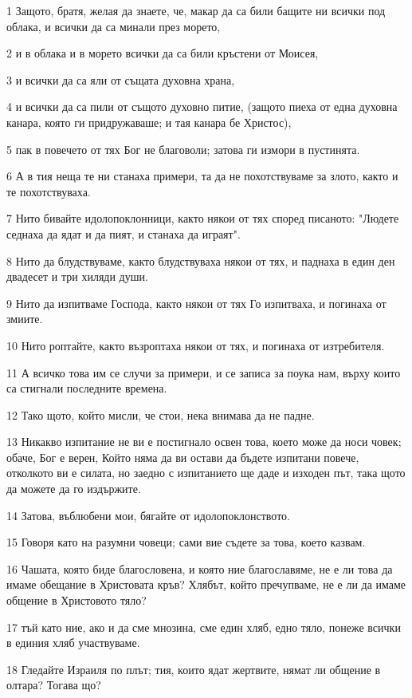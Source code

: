 \par 1 Защото, братя, желая да знаете, че, макар да са били бащите ни всички под облака, и всички да са минали през морето,
\par 2 и в облака и в морето всички да са били кръстени от Моисея,
\par 3 и всички да са яли от същата духовна храна,
\par 4 и всички да са пили от същото духовно питие, (защото пиеха от една духовна канара, която ги придружаваше; и тая канара бе Христос),
\par 5 пак в повечето от тях Бог не благоволи; затова ги измори в пустинята.
\par 6 А в тия неща те ни станаха примери, та да не похотствуваме за злото, както и те похотствуваха.
\par 7 Нито бивайте идолопоклонници, както някои от тях според писаното: "Людете седнаха да ядат и да пият, и станаха да играят".
\par 8 Нито да блудствуваме, както блудствуваха някои от тях, и паднаха в един ден двадесет и три хиляди души.
\par 9 Нито да изпитваме Господа, както някои от тях Го изпитваха, и погинаха от змиите.
\par 10 Нито роптайте, както възроптаха някои от тях, и погинаха от изтребителя.
\par 11 А всичко това им се случи за примери, и се записа за поука нам, върху които са стигнали последните времена.
\par 12 Тако щото, който мисли, че стои, нека внимава да не падне.
\par 13 Никакво изпитание не ви е постигнало освен това, което може да носи човек; обаче, Бог е верен, Който няма да ви остави да бъдете изпитани повече, отколкото ви е силата, но заедно с изпитанието ще даде и изходен път, така щото да можете да го издържите.
\par 14 Затова, въблюбени мои, бягайте от идолопоклонството.
\par 15 Говоря като на разумни човеци; сами вие съдете за това, което казвам.
\par 16 Чашата, която биде благословена, и която ние благославяме, не е ли това да имаме обещание в Христовата кръв? Хлябът, който пречупваме, не е ли да имаме общение в Христовото тяло?
\par 17 тъй като ние, ако и да сме мнозина, сме един хляб, едно тяло, понеже всички в единия хляб участвуваме.
\par 18 Гледайте Израиля по плът; тия, които ядат жертвите, нямат ли общение в олтара? Тогава що?
